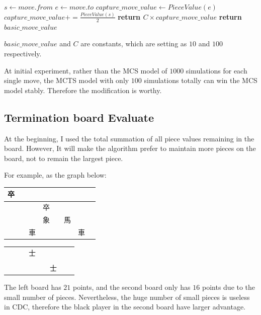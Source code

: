 \documentclass[a4paper, 12pt]{article}  %
\begin{document}
\begin{algorithm}[!h]
  \begin{algorithmic}[1]
      \State$s\gets move.from$
      \State$e\gets move.to$
        \State$capture\_move\_value \gets PieceValue(e)$
          \State$capture\_move\_value += \frac{PieceValue(s)}{2}$
        \EndIf
        \State \textbf{return $C\times capture\_move\_value$}
      \EndIf
      \State \textbf{return $basic\_move\_value$}
    \EndProcedure
  \end{algorithmic}
\end{algorithm}

$basic\_move\_value$ and $C$ are constants, which are setting as $10$ and $100$ respectively.

At initial experiment, rather than the MCS model of $1000$ simulations for each single move, the MCTS model with only $100$ simulations totally can win the MCS model stably. Therefore the modification is worthy.


\subsection{Termination board Evaluate}
At the beginning, I used the total summation of all piece values remaining in the board. However, It will make the algorithm prefer to maintain more pieces on the board, not to remain the largest piece.

For example, as the graph below:

\begin{table}[!h]
  \begin{tabular}{|c|c|c|c|c|c|c|c|}
    \hline
    卒&&&&&&&\\
    \hline
    &&&卒&&&&\\
    \hline
    &&&象&&馬&&\\
    \hline
    &&車&&&&車&\\
    \hline
  \end{tabular}
  \begin{tabular}{|c|c|c|c|c|c|c|c|}
    \hline
    &&&&&&&\\
    \hline
    &&&士&&&&\\
    \hline
    &&&&&&&\\
    \hline
    &&&&&士&&\\
    \hline
  \end{tabular}
\end{table}

The left board has $21$ points, and the second board only has $16$ points due to the small number of pieces. Nevertheless, the huge number of small pieces is useless in CDC, therefore the black player in the second board have larger advantage.
\end{document}
